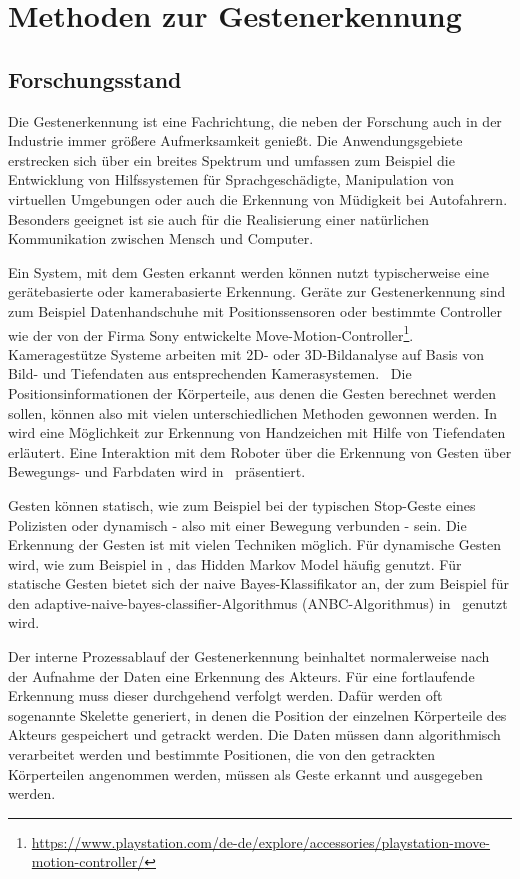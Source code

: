 \chapter{Methoden zur Gestenerkennung} \label{Gestenerkennungskapitel}

\section{Forschungsstand}
Die Gestenerkennung ist eine Fachrichtung, die neben der Forschung auch in der Industrie immer größere Aufmerksamkeit genießt. Die Anwendungsgebiete erstrecken sich über ein breites Spektrum und umfassen zum Beispiel die Entwicklung von Hilfssystemen für Sprachgeschädigte,  Manipulation von virtuellen Umgebungen oder auch die Erkennung von Müdigkeit bei Autofahrern. Besonders geeignet ist sie auch für die Realisierung einer natürlichen Kommunikation zwischen Mensch und Computer. 

Ein System, mit dem Gesten erkannt werden können nutzt typischerweise eine gerätebasierte oder kamerabasierte Erkennung. Geräte zur Gestenerkennung sind zum Beispiel Datenhandschuhe mit Positionssensoren oder bestimmte Controller wie der von der Firma Sony entwickelte Move-Motion-Controller\footnote{\url{https://www.playstation.com/de-de/explore/accessories/playstation-move-motion-controller/}}. Kameragestütze Systeme arbeiten mit 2D- oder 3D-Bildanalyse auf Basis von Bild- und Tiefendaten aus entsprechenden Kamerasystemen.~\cite{recognitionSurvey} Die Positionsinformationen der Körperteile, aus denen die Gesten berechnet werden sollen, können also mit vielen unterschiedlichen Methoden gewonnen werden. In~\cite{depthRecognition} wird eine Möglichkeit zur Erkennung von Handzeichen mit Hilfe von Tiefendaten erläutert. Eine Interaktion mit dem Roboter über die Erkennung von Gesten über Bewegungs- und Farbdaten wird in~\cite{colorRecognition} präsentiert. 

Gesten können statisch, wie zum Beispiel bei der typischen Stop-Geste eines Polizisten oder dynamisch - also mit einer Bewegung verbunden - sein. Die Erkennung der Gesten ist mit vielen Techniken möglich. Für dynamische Gesten wird, wie zum Beispiel in \cite{hiddenMarkov}, das Hidden Markov Model häufig genutzt. Für statische Gesten bietet sich der naive Bayes-Klassifikator an, der zum Beispiel für den adaptive-naive-bayes-classifier-Algorithmus (ANBC-Algorithmus) in~\cite{gillianANBC} genutzt wird.

Der interne Prozessablauf der Gestenerkennung beinhaltet normalerweise nach der Aufnahme der Daten eine Erkennung des Akteurs. Für eine fortlaufende Erkennung muss dieser durchgehend verfolgt werden. Dafür werden oft sogenannte Skelette generiert, in denen die Position der einzelnen Körperteile des Akteurs gespeichert und getrackt werden. Die Daten müssen dann algorithmisch verarbeitet werden und bestimmte Positionen, die von den getrackten Körperteilen angenommen werden, müssen als Geste erkannt und ausgegeben werden.

